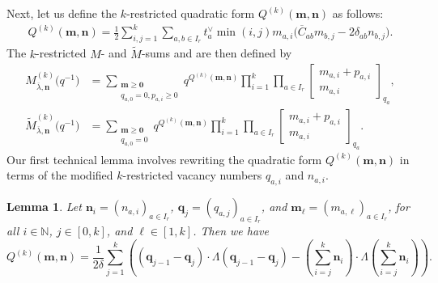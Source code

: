 \documentclass[10pt,a4paper]{amsart}
\numberwithin{equation}{section}
\newtheorem{Lemma}[Theorem]{Lemma}
\begin{document}
Next, let us define the $k$-restricted quadratic form $Q^{(k)}(\mathbf{m},\mathbf{n})$ as follows:
\begin{gather*}
Q^{(k)}(\mathbf{m},\mathbf{n})=\frac{1}{2}\sum_{i,j=1}^k \sum_{a,b\in I_r}t_a^{\vee}\min(i,j)m_{a,i}\bigl(\overline{ C}_{ab}m_{b,j} -2\delta_{ab}n_{b,j}\bigr).
\end{gather*}
The $k$-restricted $M$- and $\tilde{M}$-sums  and  are then defined by
\begin{align}
M_{\overline{\lambda},\mathbf{n}}^{(k)}\bigl(q^{-1}\bigr)
&=\sum_{\substack{\mathbf{m}\geq\mathbf{0}\\q_{a,0}=0,p_{a,i}\geq0}}q^{Q^{(k)}(\mathbf{m},\mathbf{n})}\prod_{i=1}^k\prod_{a \in I_r}\begin{bmatrix}m_{a,i}+p_{a,i}\\m_{a,i} \end{bmatrix}_{q_a},\nonumber\\
\tilde{M}_{\overline{\lambda},\mathbf{n}}^{(k)}\bigl(q^{-1}\bigr)
&=\sum_{\substack{\mathbf{m}\geq\mathbf{0}\\q_{a,0}=0}}q^{Q^{(k)}(\mathbf{m},\mathbf{n})}\prod_{i=1}^k\prod_{a\in I_r}
\begin{bmatrix}m_{a,i}+p_{a,i}\\m_{a,i}\end{bmatrix}_{q_a}.\label{eq:4.11}
\end{align}
Our first technical lemma involves rewriting the quadratic form $Q^{(k)}(\mathbf{m},\mathbf{n})$ in terms of the modified $k$-restricted vacancy numbers $q_{a,i}$ and $n_{a,i}$.
\begin{Lemma}\label{4.4}
Let $\mathbf{n}_i=(n_{a,i})_{a\in I_r}$, $\mathbf{q}_j=(q_{a,j})_{a\in I_r}$, and $\mathbf{m}_{\ell}=(m_{a,\ell})_{a\in I_r}$, for all $i\in\mathbb{N}$, $j\in[0,k]$, and $\ell\in[1,k]$. Then we have
\begin{equation*}
Q^{(k)}(\mathbf{m},\mathbf{n})=\frac{1}{2\delta}\sum_{j=1}^k \left((\mathbf{q}_{j-1}-\mathbf{q}_j)\cdot\Lambda(\mathbf{ q}_{j-1}-\mathbf{q}_j)-\left(\sum_{i=j}^k\mathbf{n}_i\right) \cdot\Lambda\left(\sum_{i=j}^k\mathbf{n}_i\right)\right).
\end{equation*}
\end{Lemma}
\end{document}
